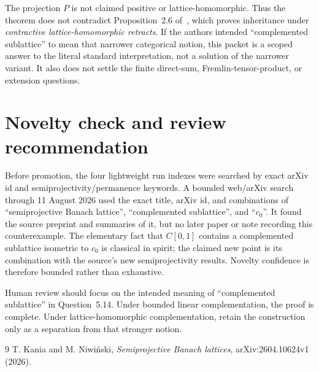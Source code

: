 \documentclass[11pt]{article}
\begin{document}
The projection $P$ is not claimed positive or lattice-homomorphic.  Thus the
theorem does not contradict Proposition~2.6 of~\cite{source}, which proves
inheritance under \emph{contractive lattice-homomorphic retracts}.  If the
authors intended ``complemented sublattice'' to mean that narrower categorical
notion, this packet is a scoped answer to the literal standard interpretation,
not a solution of the narrower variant.  It also does not settle the finite
direct-sum, Fremlin-tensor-product, or extension questions.

\section{Novelty check and review recommendation}

Before promotion, the four lightweight run indexes were searched by exact
arXiv id and semiprojectivity/permanence keywords.  A bounded web/arXiv search
through 11 August 2026 used the exact title, arXiv id, and combinations of
``semiprojective Banach lattice'', ``complemented sublattice'', and ``$c_0$''.
It found the source preprint and summaries of it, but no later paper or note
recording this counterexample.  The elementary fact that $C[0,1]$ contains a
complemented sublattice isometric to $c_0$ is classical in spirit; the claimed
new point is its combination with the source's new semiprojectivity results.
Novelty confidence is therefore bounded rather than exhaustive.

Human review should focus on the intended meaning of ``complemented
sublattice'' in Question~5.14.  Under bounded linear complementation, the
proof is complete.  Under lattice-homomorphic complementation, retain the
construction only as a separation from that stronger notion.

\begin{thebibliography}{9}
T. Kania and M. Niwi\'nski,
\emph{Semiprojective Banach lattices},
arXiv:2604.10624v1 (2026).
\end{thebibliography}
\end{document}
